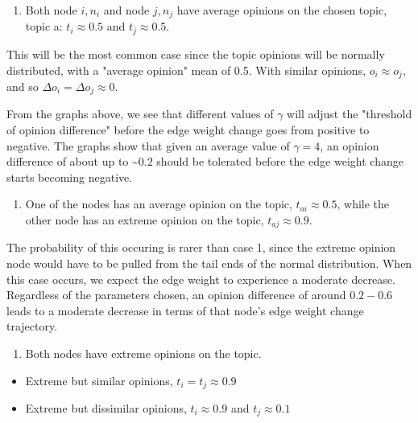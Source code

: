\documentclass[11pt]{article}
\providecommand{\tightlist}{%
      \setlength{\itemsep}{0pt}\setlength{\parskip}{0pt}}
\begin{document}
\begin{enumerate}
\def\labelenumi{\arabic{enumi})}
\tightlist
\item
  Both node \(i, n_i\) and node \(j, n_j\) have average opinions on the
  chosen topic, topic a: \(t_{i} \approx 0.5\) and
  \(t_{j} \approx 0.5\).
\end{enumerate}

This will be the most common case since the topic opinions will be
normally distributed, with a "average opinion" mean of 0.5. With similar
opinions, \(o_i \approx o_j\), and so
\(\Delta o_i = \Delta o_j \approx 0\).

From the graphs above, we see that different values of \(\gamma\) will
adjust the "threshold of opinion difference" before the edge weight
change goes from positive to negative. The graphs show that given an
average value of \(\gamma=4\), an opinion difference of about up to
\textasciitilde{}\(0.2\) should be tolerated before the edge weight
change starts becoming negative.

\begin{enumerate}
\def\labelenumi{\arabic{enumi})}
\setcounter{enumi}{1}
\tightlist
\item
  One of the nodes has an average opinion on the topic,
  \(t_{ai} \approx 0.5\), while the other node has an extreme opinion on
  the topic, \(t_{aj} \approx 0.9\).
\end{enumerate}

The probability of this occuring is rarer than case 1, since the extreme
opinion node would have to be pulled from the tail ends of the normal
distribution. When this case occurs, we expect the edge weight to
experience a moderate decrease. Regardless of the parameters chosen, an
opinion difference of around \(0.2 - 0.6\) leads to a moderate decrease
in terms of that node's edge weight change trajectory.

\begin{enumerate}
\def\labelenumi{\arabic{enumi})}
\setcounter{enumi}{2}
\tightlist
\item
  Both nodes have extreme opinions on the topic.
\end{enumerate}

\begin{itemize}
\tightlist
\item
  Extreme but similar opinions, \(t_{i} = t_{j} \approx 0.9\)
\item
  Extreme but dissimilar opinions, \(t_{i} \approx 0.9\) and
  \(t_{j} \approx 0.1\)
\end{itemize}
\end{document}

